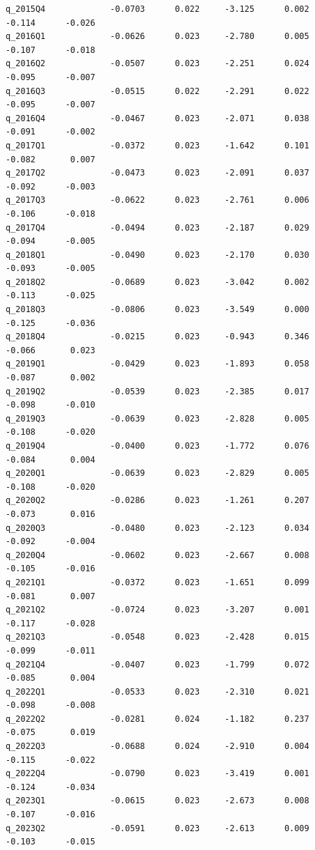 \documentclass[a4paper,11pt]{article}
\renewcommand{\_}{\textunderscore\allowbreak}
\begin{document}
\begin{verbatim}
q_2015Q4             -0.0703      0.022     -3.125      0.002      -0.114      -0.026
q_2016Q1             -0.0626      0.023     -2.780      0.005      -0.107      -0.018
q_2016Q2             -0.0507      0.023     -2.251      0.024      -0.095      -0.007
q_2016Q3             -0.0515      0.022     -2.291      0.022      -0.095      -0.007
q_2016Q4             -0.0467      0.023     -2.071      0.038      -0.091      -0.002
q_2017Q1             -0.0372      0.023     -1.642      0.101      -0.082       0.007
q_2017Q2             -0.0473      0.023     -2.091      0.037      -0.092      -0.003
q_2017Q3             -0.0622      0.023     -2.761      0.006      -0.106      -0.018
q_2017Q4             -0.0494      0.023     -2.187      0.029      -0.094      -0.005
q_2018Q1             -0.0490      0.023     -2.170      0.030      -0.093      -0.005
q_2018Q2             -0.0689      0.023     -3.042      0.002      -0.113      -0.025
q_2018Q3             -0.0806      0.023     -3.549      0.000      -0.125      -0.036
q_2018Q4             -0.0215      0.023     -0.943      0.346      -0.066       0.023
q_2019Q1             -0.0429      0.023     -1.893      0.058      -0.087       0.002
q_2019Q2             -0.0539      0.023     -2.385      0.017      -0.098      -0.010
q_2019Q3             -0.0639      0.023     -2.828      0.005      -0.108      -0.020
q_2019Q4             -0.0400      0.023     -1.772      0.076      -0.084       0.004
q_2020Q1             -0.0639      0.023     -2.829      0.005      -0.108      -0.020
q_2020Q2             -0.0286      0.023     -1.261      0.207      -0.073       0.016
q_2020Q3             -0.0480      0.023     -2.123      0.034      -0.092      -0.004
q_2020Q4             -0.0602      0.023     -2.667      0.008      -0.105      -0.016
q_2021Q1             -0.0372      0.023     -1.651      0.099      -0.081       0.007
q_2021Q2             -0.0724      0.023     -3.207      0.001      -0.117      -0.028
q_2021Q3             -0.0548      0.023     -2.428      0.015      -0.099      -0.011
q_2021Q4             -0.0407      0.023     -1.799      0.072      -0.085       0.004
q_2022Q1             -0.0533      0.023     -2.310      0.021      -0.098      -0.008
q_2022Q2             -0.0281      0.024     -1.182      0.237      -0.075       0.019
q_2022Q3             -0.0688      0.024     -2.910      0.004      -0.115      -0.022
q_2022Q4             -0.0790      0.023     -3.419      0.001      -0.124      -0.034
q_2023Q1             -0.0615      0.023     -2.673      0.008      -0.107      -0.016
q_2023Q2             -0.0591      0.023     -2.613      0.009      -0.103      -0.015

\end{verbatim}
\end{document}
